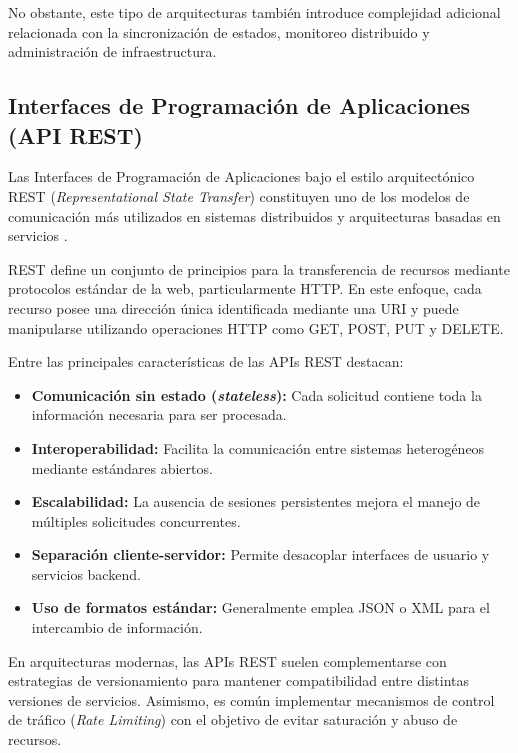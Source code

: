 \documentclass[12pt, oneside, letterpaper]{book}
\begin{document}
No obstante, este tipo de arquitecturas también introduce complejidad adicional relacionada con la sincronización de estados, monitoreo distribuido y administración de infraestructura.

\subsection{Interfaces de Programación de Aplicaciones (API REST)}

Las Interfaces de Programación de Aplicaciones bajo el estilo arquitectónico REST (\textit{Representational State Transfer}) constituyen uno de los modelos de comunicación más utilizados en sistemas distribuidos y arquitecturas basadas en servicios \cite{54}.

REST define un conjunto de principios para la transferencia de recursos mediante protocolos estándar de la web, particularmente HTTP. En este enfoque, cada recurso posee una dirección única identificada mediante una URI y puede manipularse utilizando operaciones HTTP como GET, POST, PUT y DELETE.

Entre las principales características de las APIs REST destacan:

\begin{itemize}
\item \textbf{Comunicación sin estado (\textit{stateless}):} Cada solicitud contiene toda la información necesaria para ser procesada.

\item \textbf{Interoperabilidad:} Facilita la comunicación entre sistemas heterogéneos mediante estándares abiertos.

\item \textbf{Escalabilidad:} La ausencia de sesiones persistentes mejora el manejo de múltiples solicitudes concurrentes.

\item \textbf{Separación cliente-servidor:} Permite desacoplar interfaces de usuario y servicios backend.

\item \textbf{Uso de formatos estándar:} Generalmente emplea JSON o XML para el intercambio de información.
\end{itemize}

En arquitecturas modernas, las APIs REST suelen complementarse con estrategias de versionamiento para mantener compatibilidad entre distintas versiones de servicios. Asimismo, es común implementar mecanismos de control de tráfico (\textit{Rate Limiting}) con el objetivo de evitar saturación y abuso de recursos.
\end{document}
